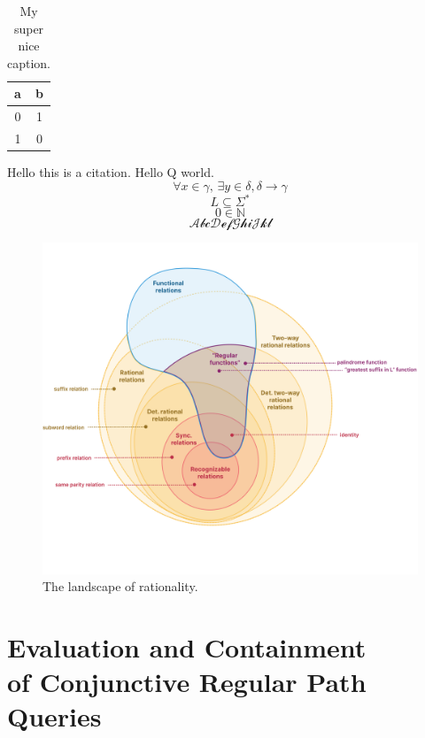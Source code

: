 \documentclass[a4paper,sfsidenotes,twoside,justified]{tufte-book-custom}
\begin{document}

\begin{table}
	\centering
	\begin{tabular}{cc}
		\toprule
		a & b \\ \midrule
		0 & 1 \\
		1 & 0 \\ \bottomrule
	\end{tabular}
	\caption{My super nice caption.}
\end{table}

Hello this is a citation\cite{Bringhurst2005}.
Hello Q world.
\[\forall x \in \gamma,\, \exists y\in \delta, \delta \to \gamma\]
\[L \subseteq \Sigma^*\]
\[0 \in \mathbb{N}\]
\[\mathcal{AbcDefGhiJkl}\]

\lipsum[1-2]

\begin{figure}[htb]
	\centering
	\includegraphics[width=\linewidth]{fig/landscape.png}
	\caption{The landscape of rationality.}
\end{figure}

\lipsum[3-10]

\chapter[Evaluation and Containment of Conjunctive Regular Path Queries]{Evaluation and Containment\\ of Conjunctive Regular Path Queries}
\end{document}
